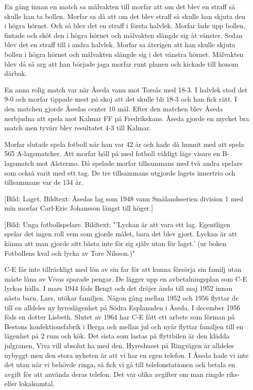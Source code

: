 En gång innan en match sa målvakten till morfar att om det blev en straff så skulle han ta bollen. Morfar sa då att om det blev straff så skulle han skjuta den i högra hörnet. Och så blev det en straff i första halvlek. Morfar lade upp bollen, fintade och sköt den i högra hörnet och målvakten slängde sig åt vänster. Sedan blev det en straff till i andra halvlek. Morfar sa återigen att han skulle skjuta bollen i högra hörnet och målvakten slängde sig i det vänstra hörnet. Målvakten blev då så arg att han började jaga morfar runt planen och kickade till honom därbak.

En anna rolig match var när Åseda vann mot Torsås med 18-3. I halvlek stod det 9-0 och morfar tippade mest på skoj att det skulle bli 18-3 och han fick rätt. I den matchen gjorde Åsedas center 10 mål. Efter den matchen blev Åseda nerbjudna att spela mot Kalmar FF på Fredrikskans. Åseda gjorde en mycket bra match men tyvärr blev resultatet 4-3 till Kalmar.

Morfar slutade spela fotboll när han var 42 år och hade då hunnit med att spela 565 A-lagsmatcher. Att morfar höll på med fotboll väldigt läge visare en B-lagsmatch mot Alstermo. Då spelade morfar tillsammans med två andra spelare som också varit med ett tag. De tre tillsammans utgjorde lagets innertrio och tillsammans var de 134 år.

[Bild: Laget. Bildtext: Åsedas lag som 1948 vann Smålandsserien division 1 med min morfar Carl-Eric Johansson längst till höger.]

[Bild: Unga fotbollspelare. Bildtext: "'Lyckan är att vara ett lag. Egentligen spelar det ingen roll vem som gjorde målet, bara det blev gjort. Lyckan är att känna att man gjorde sitt bästa inte för sig själv utan för laget.' (ur boken Fotbollens kval och lycka av Tore Nilsson.)"
\stopblockquote

 C-E får inte tillräckligt med lön av sin far för att kunna försörja sin familj utan måste låna av Vivas sparade pengar. De lägger upp en avbetalningsplan som C-E lyckas hålla. I mars 1944 föds Bengt och det dröjer ända till maj 1952 innan nästa barn, Lars, utökar familjen. Någon gång mellan 1952 och 1956 flyttar de till en alldeles ny hyreslägenhet på Södra Esplanaden i Åseda. I december 1956 föds en dotter Lisbeth.
Slutet av 1964 har C-E fått ett arbete som förman på Bestons konfektionsfabrik i Berga och mellan jul och nyår flyttar familjen till en lägenhet på 2 rum och kök. Det sista som lastas på flyttbilen är den klädda julgranen, Viva vill absolut ha med den. 
Hyreshuset på Ringvägen är alldeles nybyggt men den stora nyheten är att vi har en egen telefon. I Åseda hade vi inte det utan när vi behövde ringa, så fick vi gå till telefonstationen och betala en avgift för att använda deras telefon. Det var olika avgifter om man ringde riks- eller lokalsamtal.

